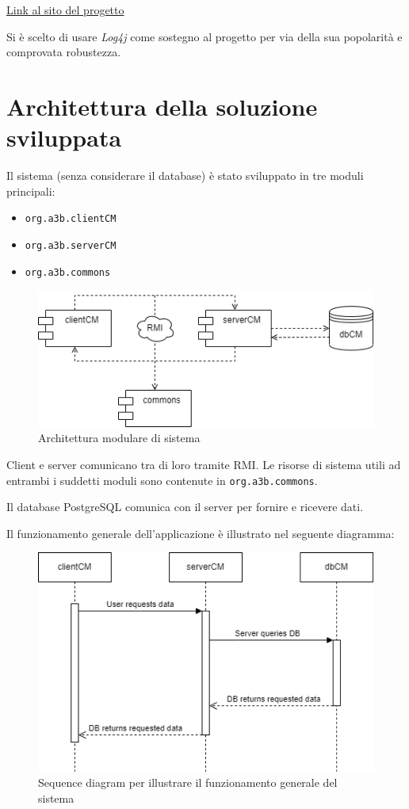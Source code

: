 \href{https://logging.apache.org/log4j/2.x/}{Link al sito del progetto}

Si è scelto di usare \textsl{Log4j} come sostegno al progetto per via della sua popolarità e comprovata robustezza.

\chapter{Architettura della soluzione sviluppata}
Il sistema (senza considerare il database) è stato sviluppato in tre moduli principali:
\begin{itemize}
	\item \texttt{org.a3b.clientCM}
	\item \texttt{org.a3b.serverCM}
	\item \texttt{org.a3b.commons}
\end{itemize}

\begin{figure}[h]
	\centering
	\caption{Architettura modulare di sistema}
	\label{fig:architettuta}
	\includegraphics[width=0.8\linewidth]{../../fig/img/tecnico/architettuta.drawio}
\end{figure}

Client e server comunicano tra di loro tramite RMI. Le risorse di sistema utili ad entrambi i suddetti moduli sono contenute in \texttt{org.a3b.commons}.

Il database PostgreSQL comunica con il server per fornire e ricevere dati.

Il funzionamento generale dell'applicazione è illustrato nel seguente diagramma:

\begin{figure}[h]
	\centering
	\caption{Sequence diagram per illustrare il funzionamento generale del sistema}
	\label{fig:sequence}
	\includegraphics[width=0.7\linewidth]{../../fig/img/tecnico/sequence.drawio}
\end{figure}

